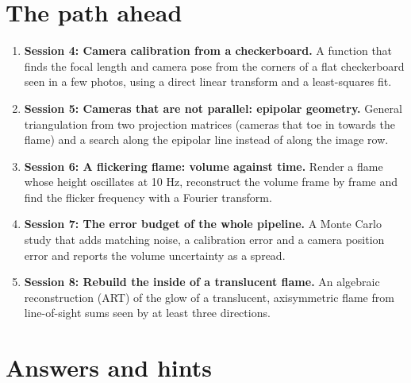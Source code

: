 \documentclass[11pt,a4paper]{article}
\begin{document}
\section{The path ahead}
\begin{enumerate}[nosep]
\item \textbf{Session 4: Camera calibration from a checkerboard.} A function that finds the focal length and camera pose from the corners of a flat checkerboard seen in a few photos, using a direct linear transform and a least-squares fit.
\item \textbf{Session 5: Cameras that are not parallel: epipolar geometry.} General triangulation from two projection matrices (cameras that toe in towards the flame) and a search along the epipolar line instead of along the image row.
\item \textbf{Session 6: A flickering flame: volume against time.} Render a flame whose height oscillates at 10 Hz, reconstruct the volume frame by frame and find the flicker frequency with a Fourier transform.
\item \textbf{Session 7: The error budget of the whole pipeline.} A Monte Carlo study that adds matching noise, a calibration error and a camera position error and reports the volume uncertainty as a spread.
\item \textbf{Session 8: Rebuild the inside of a translucent flame.} An algebraic reconstruction (ART) of the glow of a translucent, axisymmetric flame from line-of-sight sums seen by at least three directions.
\end{enumerate}

\section{Answers and hints}
\end{document}
